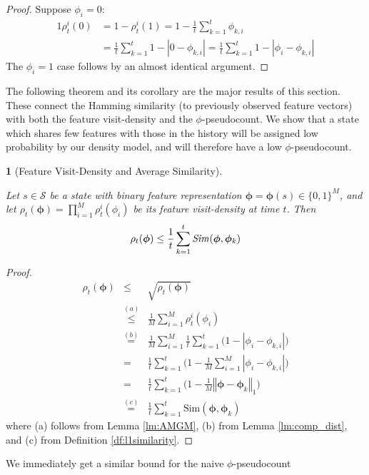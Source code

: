 \documentclass{article}
\theoremstyle{definition}
\theoremstyle{definition}
\theoremstyle{plain}
\theoremstyle{plain}
\newtheorem{thm}{\protect\theoremname}
\theoremstyle{plain}
\providecommand{\theoremname}{Theorem}
\begin{document}
\begin{proof}
\noindent Suppose $\phi_{i}=0$:
\begin{alignat*}{1}
\rho_{t}^{i}(0) & =1-\rho_{t}^{i}(1)=1-\frac{1}{t}\sum_{k=1}^{t}\phi_{k,i}\\
 & =\frac{1}{t}\sum_{k=1}^{t}1-\left|0-\phi_{k,i}\right|=\frac{1}{t}\sum_{k=1}^{t}1-\left|\phi_{i}-\phi_{k,i}\right|
\end{alignat*}
The $\phi_{i}=1$ case follows by an almost identical argument. 
\end{proof}
\noindent The following theorem and its corollary are the major results
of this section. These connect the Hamming similarity (to previously
observed feature vectors) with both the feature visit-density and
the $\phi$-pseudocount. We show that a state which shares few features
with those in the history will be assigned low probability by our
density model, and will therefore have a low $\phi$-pseudocount.
\begin{thm}
[Feature Visit-Density and Average Similarity]\label{th:rhomaxsim}

\noindent Let $s\in\mathcal{S}$ be a state with binary feature representation
$\bm{\phi}=\bm{\phi}(s)\in\{0,1\}^{M}$, and let $\rho_{t}(\bm{\phi})=\prod_{i=1}^{M}\rho_{t}^{i}(\phi_{i})$
be its feature visit-density at time $t$. Then 
\[
\rho_{t}(\bm{\phi})\leq\frac{1}{t}\sum_{k=1}^{t}\mbox{\emph{Sim}}(\bm{\phi},\bm{\phi}_{k})
\]
\end{thm}
\begin{proof}
\begin{eqnarray*}
\rho_{t}(\bm{\phi}) & \leq & \sqrt{\rho_{t}(\bm{\phi})}\\
 & \stackrel{(a)}{\leq} & \frac{1}{M}\sum_{i=1}^{M}\rho_{t}^{i}(\phi_{i})\\
 & \stackrel{(b)}{=} & \frac{1}{M}\sum_{i=1}^{M}\frac{1}{t}\sum_{k=1}^{t}\big(1-\left|\phi_{i}-\phi_{k,i}\right|\big)\\
 & = & \frac{1}{t}\sum_{k=1}^{t}\big(1-\frac{1}{M}\sum_{i=1}^{M}\left|\phi_{i}-\phi_{k,i}\right|\big)\\
 & = & \frac{1}{t}\sum_{k=1}^{t}\big(1-\frac{1}{M}\left\Vert \bm{\phi}-\bm{\phi}_{k}\right\Vert _{1}\big)\\
 & \stackrel{(c)}{=} & \frac{1}{t}\sum_{k=1}^{t}\mbox{Sim}(\bm{\phi},\bm{\phi}_{k})
\end{eqnarray*}
where (a) follows from Lemma \ref{lm:AMGM}, (b) from Lemma \ref{lm:comp_dist},
and (c) from Definition \ref{df:l1similarity}. 
\end{proof}
\noindent We immediately get a similar bound for the naive $\phi$-pseudocount
\end{document}
